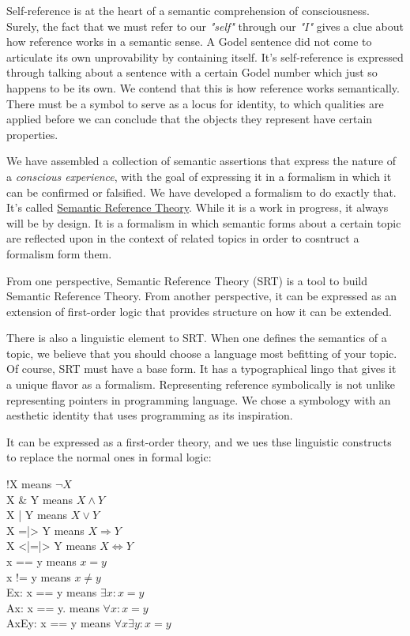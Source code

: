 \documentclass[runningheads]{llncs}
\begin{document}
Self-reference is at the heart of a semantic comprehension of consciousness. Surely, the fact that we must refer to our \emph{"self"} through our \emph{"I"} gives a clue about how reference works in a semantic sense. A Godel sentence did not come to articulate its own unprovability by containing itself. It's self-reference is expressed through talking about a sentence with a certain Godel number which just so happens to be its own. We contend that this is how reference works semantically. There must be a symbol to serve as a locus for identity, to which qualities are applied before we can conclude that the objects they represent have certain properties. 

We have assembled a collection of semantic assertions that express the nature of a \emph{conscious experience}, with the goal of expressing it in a formalism in which it can be confirmed or falsified. We have developed a formalism to do exactly that. It's called \href{https://github.com/DNA-Platform/inexplicable-phenomena/formalism/semantic-reference-theory/introduction.pdf}{Semantic Reference Theory}. While it is a work in progress, it always will be by design. It is a formalism in which semantic forms about a certain topic are reflected upon in the context of related topics in order to cosntruct a formalism form them. 

From one perspective, Semantic Reference Theory (SRT) is a tool to build Semantic Reference Theory. From another perspective, it can be expressed as an extension of first-order logic that provides structure on how it can be extended. 

There is also a linguistic element to SRT. When one defines the semantics of a topic, we believe that you should choose a language most befitting of your topic. Of course, SRT must have a base form. It has a typographical lingo that gives it a unique flavor as a formalism. Representing reference symbolically is not unlike representing pointers in programming language. We chose a symbology with an aesthetic identity that uses programming as its inspiration.

It can be expressed as a first-order theory, and we ues thse linguistic constructs to replace the normal ones in formal logic:

!X means $\neg X$ \\
X \& Y means $X \land Y$ \\
X | Y means $X \lor Y$ \\
X =|> Y means $X \Rightarrow Y$ \\
X <|=|> Y means $X \Leftrightarrow Y$ \\
x == y means $x = y$ \\
x != y means $x \neq y$ \\
Ex: x == y means $\exists x: x = y$ \\
Ax: x == y. means $\forall x: x = y$ \\
AxEy: x == y means $\forall x\exists y: x = y$ \\
\end{document}
